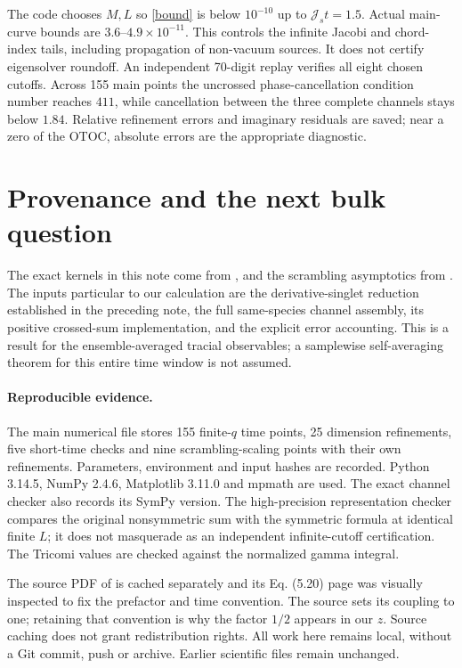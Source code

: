 \documentclass[11pt,a4paper]{article}
\newcommand{\Js}{\mathcal J_s}
\begin{document}
The code chooses $M,L$ so \eqref{bound} is below $10^{-10}$ up to
$\Js t=1.5$. Actual main-curve bounds are $3.6$--$4.9\times10^{-11}$.
This controls the infinite Jacobi and chord-index tails, including
propagation of non-vacuum sources. It does not certify eigensolver
roundoff. An independent 70-digit replay verifies all eight chosen
cutoffs. Across 155 main points the uncrossed phase-cancellation condition
number reaches $411$, while cancellation between the three complete
channels stays below $1.84$. Relative refinement errors and imaginary
residuals are saved; near a zero of the OTOC, absolute errors are the
appropriate diagnostic.

\newpage
\section{Provenance and the next bulk question}
The exact kernels in this note come from \cite{bint,bnr}, and the
scrambling asymptotics from \cite{mukh}. The inputs particular to our
calculation are the derivative-singlet reduction established in the
preceding note, the full same-species channel assembly, its positive
crossed-sum implementation, and the explicit error accounting.
This is a result for the ensemble-averaged tracial observables; a
samplewise self-averaging theorem for this entire time window is not
assumed.

\paragraph{Reproducible evidence.}
The main numerical file stores 155 finite-$q$ time points, 25 dimension
refinements, five short-time checks and nine scrambling-scaling points
with their own refinements. Parameters, environment and input hashes
are recorded. Python 3.14.5, NumPy 2.4.6, Matplotlib 3.11.0 and mpmath
are used. The exact channel checker also records its SymPy version.
The high-precision representation checker compares the original
nonsymmetric sum with the symmetric formula at identical finite $L$;
it does not masquerade as an independent infinite-cutoff certification.
The Tricomi values are checked against the normalized gamma integral.

The source PDF of \cite{mukh} is cached separately and its Eq. (5.20)
page was visually inspected to fix the prefactor and time convention.
The source sets its coupling to one; retaining that convention is why
the factor $1/2$ appears in our $z$. Source caching does not grant
redistribution rights. All work here remains local, without a Git
commit, push or archive. Earlier scientific files remain unchanged.
\end{document}
